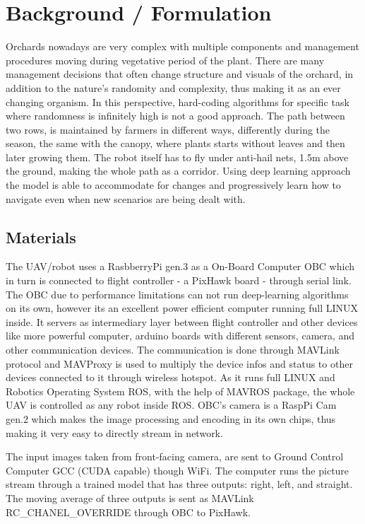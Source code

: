 \documentclass[10pt,jaurnal,compsoc]{IEEEtran}
\begin{document}
\section{Background / Formulation}
Orchards nowadays are very complex with multiple components and management procedures moving during vegetative period of the plant. There are many management decisions that often change structure and visuals of the orchard, in addition to the nature's randomity and complexity, thus making it as an ever changing organism. In this perspective, hard-coding algorithms for specific task where randomness is infinitely high is not a good approach. The path between two rows, is maintained by farmers in different ways, differently during the season, the same with the canopy, where plants starts without leaves and then later growing them. The robot itself has to fly under anti-hail nets, 1.5m above the ground, making the whole path as a corridor. Using deep learning approach the model is able to accommodate for changes and progressively learn how to navigate even when new scenarios are being dealt with.

\subsection{Materials}
The UAV/robot uses a RasbberryPi gen.3 as a On-Board Computer OBC which in turn is connected to flight controller - a PixHawk board - through serial link. The OBC due to performance limitations can not run deep-learning algorithms on its own, however its an excellent power efficient computer running full LINUX inside. It servers as intermediary layer between flight controller and other devices like more powerful computer, arduino boards with different sensors, camera, and other communication devices. The communication is done through MAVLink protocol and MAVProxy is used to multiply the device infos and status to other devices connected to it through wireless hotspot. As it runs full LINUX and Robotics Operating System ROS, with the help of MAVROS package, the whole UAV is controlled as any robot inside ROS. OBC's camera is a RaspPi Cam gen.2 which makes the image processing and encoding in its own chips, thus making it very easy to directly stream in network.

The input images taken from front-facing camera, are sent to Ground Control Computer GCC (CUDA capable) though WiFi. The computer runs the picture stream through a trained model that has three outputs: right, left, and straight. The moving average of three outputs is sent as MAVLink RC\_CHANEL\_OVERRIDE through OBC to PixHawk.
\end{document}
